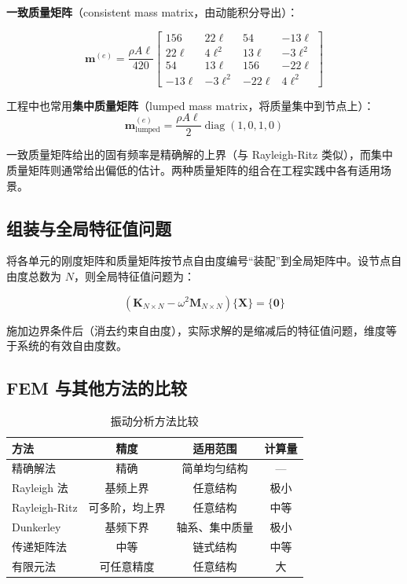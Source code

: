 \textbf{一致质量矩阵}（consistent mass matrix，由动能积分导出）：
\begin{myformula}
\[
\mathbf{m}^{(e)} = \frac{\rho A \ell}{420}\begin{bmatrix}
156 & 22\ell & 54 & -13\ell \\
22\ell & 4\ell^2 & 13\ell & -3\ell^2 \\
54 & 13\ell & 156 & -22\ell \\
-13\ell & -3\ell^2 & -22\ell & 4\ell^2
\end{bmatrix}
\]
\end{myformula}

工程中也常用\textbf{集中质量矩阵}（lumped mass matrix，将质量集中到节点上）：
\[
\mathbf{m}_{\text{lumped}}^{(e)} = \frac{\rho A\ell}{2}\operatorname{diag}(1, 0, 1, 0)
\]

\begin{remark}
一致质量矩阵给出的固有频率是精确解的上界（与 Rayleigh-Ritz 类似），而集中质量矩阵则通常给出偏低的估计。两种质量矩阵的组合在工程实践中各有适用场景。
\end{remark}

\subsection{组装与全局特征值问题}

将各单元的刚度矩阵和质量矩阵按节点自由度编号``装配''到全局矩阵中。设节点自由度总数为 $N$，则全局特征值问题为：

\[
(\mathbf{K}_{N\times N} - \omega^2\mathbf{M}_{N\times N})\{\mathbf{X}\} = \{\mathbf{0}\}
\]

施加边界条件后（消去约束自由度），实际求解的是缩减后的特征值问题，维度等于系统的有效自由度数。

\subsection{FEM 与其他方法的比较}

\begin{table}[H]\centering
\caption{振动分析方法比较}
\label{tab:method-comparison}
\begin{tabular}{lccc}
\toprule
方法 & 精度 & 适用范围 & 计算量 \\
\midrule
精确解法 & 精确 & 简单均匀结构 & — \\
Rayleigh 法 & 基频上界 & 任意结构 & 极小 \\
Rayleigh-Ritz & 可多阶，均上界 & 任意结构 & 中等 \\
Dunkerley & 基频下界 & 轴系、集中质量 & 极小 \\
传递矩阵法 & 中等 & 链式结构 & 中等 \\
有限元法 & 可任意精度 & 任意结构 & 大 \\
\bottomrule
\end{tabular}
\end{table}

